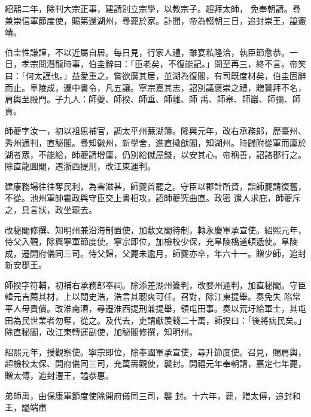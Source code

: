 \begin{pinyinscope}
 紹熙二年，除判大宗正事，建請別立宗學，以教宗子。超拜太師，
 免奉朝請。尋兼崇信軍節度使，賜第還湖州，尋薨於家。訃聞，帝為輟朝三日，追封崇王，謚憲靖。



 伯圭性謙謹，不以近屬自居。每日見，行家人禮，雖宴私隆洽，執臣節愈恭。一日，孝宗問潛龍時事，伯圭辭曰：「臣老矣，不復能記。」問至再三，終不言。帝笑曰：「何太謹也。」益愛重之。嘗欲廣其居，並湖為復閣，有司既度材矣，伯圭固辭而止。阜陵成，遷中書令，凡五讓。寧宗嘉其志，詔別議褒崇之禮，贈贊拜不名，肩輿至殿門。子九人：師夔、師揆、師垂、師離、師
 禹、師皋、師巖、師彌、師貢。



 師夔字汝一，初以祖恩補官，調太平州蕪湖簿。隆興元年，改右承務郎，歷臺州、秀州通判，直秘閣。尋知徽州，新學舍，進直徽猷閣，知湖州。時歸附從軍而廩於湖者眾，不能給，師夔請增廩，仍別給僦屋錢，以安其心。帝稱善，詔諸郡行之。除直龍圖閣，遷浙西提刑，改江東運判。



 建康務場往往奪民利，為害滋甚，師夔首罷之。守臣以郡計所資，詣師夔請復舊，不從。池州軍帥霍政與守臣交上書相攻，詔師夔究曲直。政密
 遣人求庇，師夔斥之，具言狀，政坐罷去。



 改秘閣修撰、知明州兼沿海制置使，加敷文閣待制，轉永慶軍承宣使。紹熙元年，侍父入覲，除興寧軍節度使。寧宗即位，加檢校少保，充阜陵橋道頓遞使。阜陵成，遷開府儀同三司。侍父歸，父薨未逾月，師夔亦卒，年六十一。贈少師，追封新安郡王。



 師揆字符輔，初補右承務郎奉祠。除添差湖州簽判，改婺州通判，加直秘閣。守臣韓元吉薦其材，上以問史浩，浩言其聰爽可任。召對，除江東提舉。奏免失
 陷常平人毋責償。改淮南漕，尋遷淮西提刑兼提舉，領屯田事。奏以荒圩給軍士，其屯田為民世業者勿奪，從之。及代去，吏請獻羨錢二十萬，師揆曰：「後將病民矣。」除直秘閣，改江東轉運副使，加秘閣修撰，知明州。



 紹熙元年，授觀察使。寧宗即位，除奉國軍承宣使，尋升節度使。召見，賜肩輿，超檢校太保、開府儀同三司，充萬壽觀使，襲封。開禧元年奉朝請，嘉定七年薨，贈太傅，追封澧王，謚恭惠。



 弟師禹，由保康軍節度使除開府儀同三司，襲
 封。十六年，薨，贈太傅，追封和王，謚端肅



\end{pinyinscope}